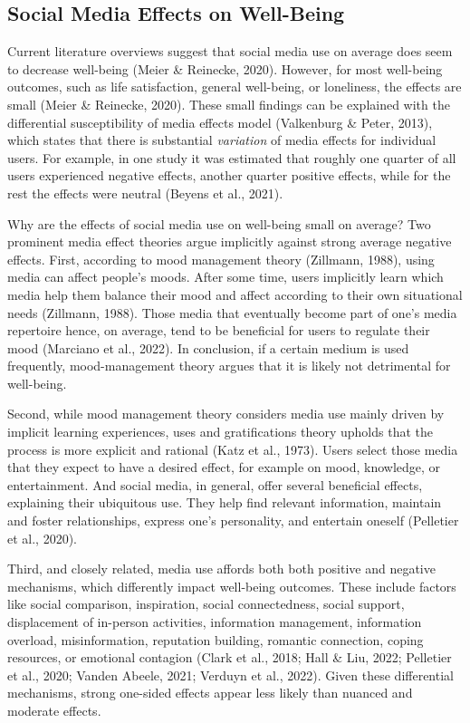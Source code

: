 \documentclass[
  man,mask,floatsintext]{apa7}
\begin{document}
\subsection{Social Media Effects on Well-Being}\label{social-media-effects-on-well-being}

Current literature overviews suggest that social media use on average does seem to decrease well-being (Meier \& Reinecke, 2020).
However, for most well-being outcomes, such as life satisfaction, general well-being, or loneliness, the effects are small (Meier \& Reinecke, 2020).
These small findings can be explained with the differential susceptibility of media effects model (Valkenburg \& Peter, 2013), which states that there is substantial \emph{variation} of media effects for individual users.
For example, in one study it was estimated that roughly one quarter of all users experienced negative effects, another quarter positive effects, while for the rest the effects were neutral (Beyens et al., 2021).

Why are the effects of social media use on well-being small on average?
Two prominent media effect theories argue implicitly against strong average negative effects.
First, according to mood management theory (Zillmann, 1988), using media can affect people's moods.
After some time, users implicitly learn which media help them balance their mood and affect according to their own situational needs (Zillmann, 1988).
Those media that eventually become part of one's media repertoire hence, on average, tend to be beneficial for users to regulate their mood (Marciano et al., 2022).
In conclusion, if a certain medium is used frequently, mood-management theory argues that it is likely not detrimental for well-being.

Second, while mood management theory considers media use mainly driven by implicit learning experiences, uses and gratifications theory upholds that the process is more explicit and rational (Katz et al., 1973).
Users select those media that they expect to have a desired effect, for example on mood, knowledge, or entertainment.
And social media, in general, offer several beneficial effects, explaining their ubiquitous use.
They help find relevant information, maintain and foster relationships, express one's personality, and entertain oneself (Pelletier et al., 2020).

Third, and closely related, media use affords both both positive and negative mechanisms, which differently impact well-being outcomes.
These include factors like social comparison, inspiration, social connectedness, social support, displacement of in-person activities, information management, information overload, misinformation, reputation building, romantic connection, coping resources, or emotional contagion (Clark et al., 2018; Hall \& Liu, 2022; Pelletier et al., 2020; Vanden Abeele, 2021; Verduyn et al., 2022).
Given these differential mechanisms, strong one-sided effects appear less likely than nuanced and moderate effects.
\end{document}
